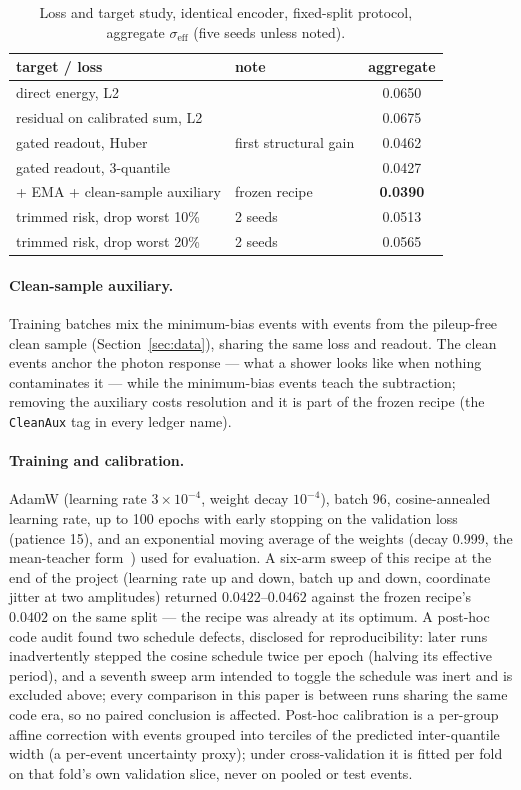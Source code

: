 \documentclass[11pt,a4paper]{article}
\newcommand{\seff}{\ensuremath{\sigma_{\mathrm{eff}}}}
\begin{document}
\begin{table}[h]
\centering
\caption{Loss and target study, identical encoder, fixed-split protocol,
aggregate \seff{} (five seeds unless noted).}
\label{tab:loss}
\small
\begin{tabular}{llc}
\toprule
target / loss & note & aggregate\\
\midrule
direct energy, L2 & & 0.0650\\
residual on calibrated sum, L2 & & 0.0675\\
gated readout, Huber & first structural gain & 0.0462\\
gated readout, 3-quantile & & 0.0427\\
+ EMA + clean-sample auxiliary & frozen recipe & \textbf{0.0390}\\
\midrule
trimmed risk, drop worst 10\% & 2 seeds & 0.0513\\
trimmed risk, drop worst 20\% & 2 seeds & 0.0565\\
\bottomrule
\end{tabular}
\end{table}

\paragraph{Clean-sample auxiliary.} Training batches mix the minimum-bias
events with events from the pileup-free clean sample
(Section~\ref{sec:data}), sharing the same loss and readout. The clean
events anchor the photon response --- what a shower looks like when nothing
contaminates it --- while the minimum-bias events teach the subtraction;
removing the auxiliary costs resolution and it is part of the frozen recipe
(the \texttt{CleanAux} tag in every ledger name).

\paragraph{Training and calibration.} AdamW (learning rate $3\times10^{-4}$,
weight decay $10^{-4}$), batch 96, cosine-annealed learning rate, up to 100
epochs with early stopping on the validation loss (patience 15), and an
exponential moving average of the weights (decay 0.999, the mean-teacher
form~\cite{meanteacher}) used for evaluation. A six-arm sweep of this recipe at the end of the project
(learning rate up and down, batch up and down, coordinate jitter at two
amplitudes) returned $0.0422$--$0.0462$ against the frozen recipe's
$0.0402$ on the same split --- the recipe was already at its optimum. A
post-hoc code audit found two schedule defects, disclosed for
reproducibility: later runs inadvertently stepped the cosine schedule twice
per epoch (halving its effective period), and a seventh sweep arm intended
to toggle the schedule was inert and is excluded above; every comparison in
this paper is between runs sharing the same code era, so no paired
conclusion is affected. Post-hoc calibration is a per-group affine
correction with events grouped into terciles of the predicted
inter-quantile width (a per-event uncertainty proxy); under cross-validation
it is fitted per fold on that fold's own validation slice, never on pooled
or test events.
\end{document}
